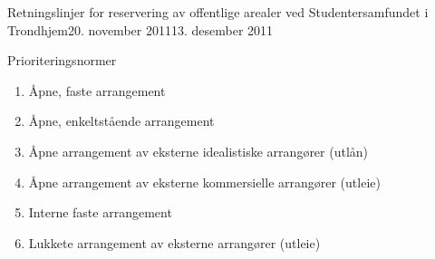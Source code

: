\documentclass[fsbok.tex]{subfiles}
\begin{document}
\begin{instruks}{Retningslinjer for reservering av offentlige arealer
    ved Studentersamfundet i Trondhjem}{20. november 2011}{13. desember 2011}
\begin{instruksledd}{Prioriteringsnormer}
\begin{enumerate}
\begin{enumerate}
\begin{enumerate}
                            \item Åpne, faste arrangement
                            \item Åpne, enkeltstående arrangement
                            \item Åpne arrangement av eksterne idealistiske arrangører (utlån)
                            \item Åpne arrangement av eksterne kommersielle arrangører (utleie)
                            \item Interne faste arrangement
                            \item Lukkete arrangement av eksterne arrangører (utleie)
                        \end{enumerate}
                \end{enumerate}
        \end{enumerate}
    \end{instruksledd}

    

\end{instruks}
\end{document}
